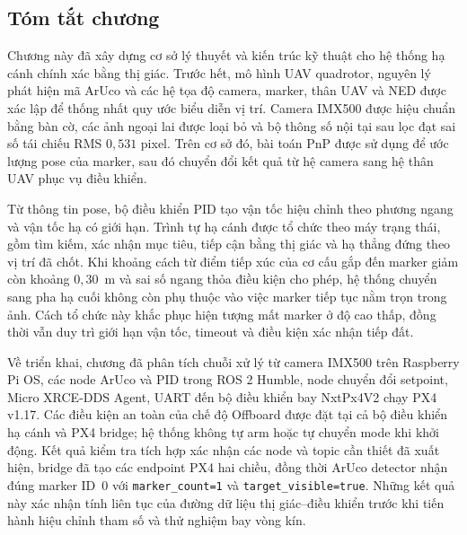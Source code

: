 \subsection{Tóm tắt chương}

Chương này đã xây dựng cơ sở lý thuyết và kiến trúc kỹ thuật cho hệ thống hạ cánh chính xác bằng thị giác. Trước hết, mô hình UAV quadrotor, nguyên lý phát hiện mã ArUco và các hệ tọa độ camera, marker, thân UAV và NED được xác lập để thống nhất quy ước biểu diễn vị trí. Camera IMX500 được hiệu chuẩn bằng bàn cờ, các ảnh ngoại lai được loại bỏ và bộ thông số nội tại sau lọc đạt sai số tái chiếu RMS $0{,}531$ pixel. Trên cơ sở đó, bài toán PnP được sử dụng để ước lượng pose của marker, sau đó chuyển đổi kết quả từ hệ camera sang hệ thân UAV phục vụ điều khiển.

Từ thông tin pose, bộ điều khiển PID tạo vận tốc hiệu chỉnh theo phương ngang và vận tốc hạ có giới hạn. Trình tự hạ cánh được tổ chức theo máy trạng thái, gồm tìm kiếm, xác nhận mục tiêu, tiếp cận bằng thị giác và hạ thẳng đứng theo vị trí đã chốt. Khi khoảng cách từ điểm tiếp xúc của cơ cấu gắp đến marker giảm còn khoảng $0{,}30$~m và sai số ngang thỏa điều kiện cho phép, hệ thống chuyển sang pha hạ cuối không còn phụ thuộc vào việc marker tiếp tục nằm trọn trong ảnh. Cách tổ chức này khắc phục hiện tượng mất marker ở độ cao thấp, đồng thời vẫn duy trì giới hạn vận tốc, timeout và điều kiện xác nhận tiếp đất.

Về triển khai, chương đã phân tích chuỗi xử lý từ camera IMX500 trên Raspberry Pi OS, các node ArUco và PID trong ROS 2 Humble, node chuyển đổi setpoint, Micro XRCE-DDS Agent, UART đến bộ điều khiển bay NxtPx4V2 chạy PX4 v1.17. Các điều kiện an toàn của chế độ Offboard được đặt tại cả bộ điều khiển hạ cánh và PX4 bridge; hệ thống không tự arm hoặc tự chuyển mode khi khởi động. Kết quả kiểm tra tích hợp xác nhận các node và topic cần thiết đã xuất hiện, bridge đã tạo các endpoint PX4 hai chiều, đồng thời ArUco detector nhận đúng marker ID~0 với \texttt{marker\_count=1} và \texttt{target\_visible=true}. Những kết quả này xác nhận tính liên tục của đường dữ liệu thị giác--điều khiển trước khi tiến hành hiệu chỉnh tham số và thử nghiệm bay vòng kín.
